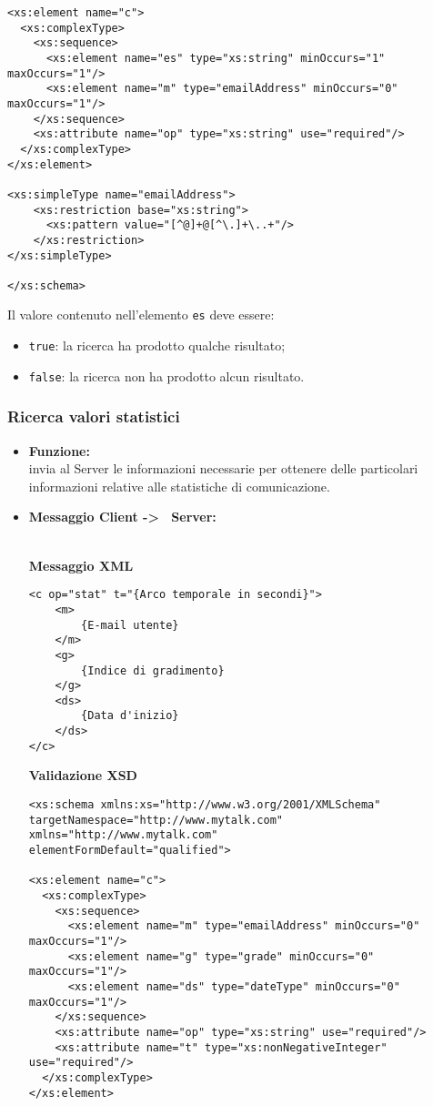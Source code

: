 {{\begin{itemize}
{\begin{lstlisting}
<xs:element name="c">
  <xs:complexType>
    <xs:sequence>
      <xs:element name="es" type="xs:string" minOccurs="1" maxOccurs="1"/>
      <xs:element name="m" type="emailAddress" minOccurs="0" maxOccurs="1"/>
    </xs:sequence>
    <xs:attribute name="op" type="xs:string" use="required"/>
  </xs:complexType>
</xs:element>

<xs:simpleType name="emailAddress"> 
    <xs:restriction base="xs:string"> 
      <xs:pattern value="[^@]+@[^\.]+\..+"/> 
    </xs:restriction> 
</xs:simpleType>

</xs:schema>
				\end{lstlisting}
				Il valore contenuto nell'elemento \texttt{es} deve essere:
				\begin{itemize}
					\item \texttt{true}: la ricerca ha prodotto qualche risultato;
					\item \texttt{false}: la ricerca non ha prodotto alcun risultato.
				\end{itemize}
				}
		\end{itemize}
	}%
	
	\subsubsection{Ricerca valori statistici}{
	\label{opCValStat}
		\begin{itemize}
			\item[] \textbf{Funzione:}{\\
				invia al Server le informazioni necessarie per ottenere delle particolari informazioni relative alle statistiche di comunicazione.
				}
			
			\item[] \textbf{Messaggio Client -\textgreater~ Server:}{\\
			\textbf{Messaggio XML}\\
				\begin{lstlisting}
<c op="stat" t="{Arco temporale in secondi}">
	<m>
		{E-mail utente}
	</m>
	<g>
		{Indice di gradimento}
	</g>
	<ds>
		{Data d'inizio}
	</ds>
</c>
				\end{lstlisting}
				\textbf{Validazione XSD}\\
				\begin{lstlisting}
<xs:schema xmlns:xs="http://www.w3.org/2001/XMLSchema"
targetNamespace="http://www.mytalk.com"
xmlns="http://www.mytalk.com"
elementFormDefault="qualified">

<xs:element name="c">
  <xs:complexType>
    <xs:sequence>
      <xs:element name="m" type="emailAddress" minOccurs="0" maxOccurs="1"/>
      <xs:element name="g" type="grade" minOccurs="0" maxOccurs="1"/>
      <xs:element name="ds" type="dateType" minOccurs="0" maxOccurs="1"/>
    </xs:sequence>
    <xs:attribute name="op" type="xs:string" use="required"/>
    <xs:attribute name="t" type="xs:nonNegativeInteger" use="required"/>
  </xs:complexType>
</xs:element>


\end{lstlisting}}
\end{itemize}}}
